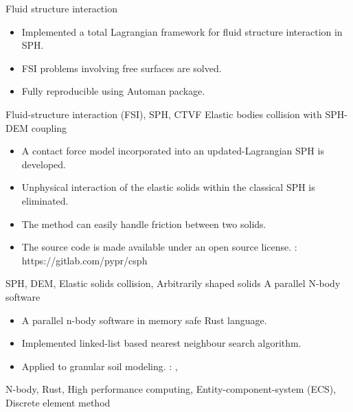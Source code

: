\begin{experiences}
  \emptySeparator
  \experience
  {} {Fluid structure interaction}{}{}
  {}    {
    \begin{itemize}
        \item Implemented a total Lagrangian framework for fluid structure interaction in SPH.
        \item FSI problems involving free surfaces are solved.
        \item Fully reproducible using Automan package.
    \end{itemize}
  }
  {Fluid-structure interaction (FSI), SPH, CTVF}
  \emptySeparator
  \experience
  {} {Elastic bodies collision with SPH-DEM coupling}{}{}
  {} {
                      \begin{itemize}
                      \item  A contact force model incorporated into an updated-Lagrangian SPH is developed.
                      \item  Unphysical interaction of the elastic solids within the classical SPH is eliminated.
                      \item  The method can easily handle friction between two solids.
                      \item  The source code is made available under an open source license.
                        \faGithub:  {https://gitlab.com/pypr/csph}
                      \end{itemize}
                    }
                    {SPH, DEM, Elastic solids collision, Arbitrarily shaped solids}
  \emptySeparator
  \experience
  {} {A parallel N-body software}{}{}
  {}    {
    \begin{itemize}
      \item A parallel n-body software in memory safe Rust language.
      \item Implemented linked-list based nearest neighbour search algorithm.
      \item Applied to granular soil modeling.
        \faGithub: ,
    \end{itemize}
  }
  {N-body, Rust, High performance computing, Entity-component-system (ECS), Discrete element method}


\end{experiences}
